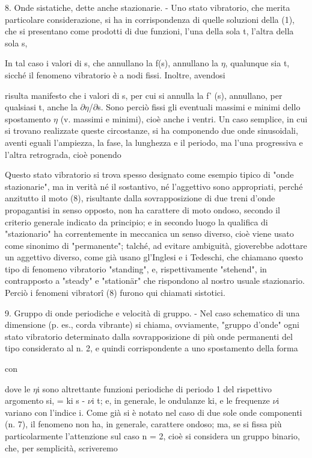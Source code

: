 \documentclass[a4paper]{article}
\begin{document}
8. Onde sistatiche, dette anche stazionarie. - Uno stato vibratorio, che merita particolare considerazione, si ha in corrispondenza di quelle soluzioni della (1), che si presentano come prodotti di due funzioni, l'una della sola t, l'altra della sola s,

In tal caso i valori di s, che annullano la f(s), annullano la $\eta$, qualunque sia t, sicché il fenomeno vibratorio è a nodi fissi. Inoltre, avendosi

risulta manifesto che i valori di s, per cui si annulla la f' (s), annullano, per qualsiasi t, anche la $\partial$$\eta$/$\partial$s. Sono perciò fissi gli eventuali massimi e minimi dello spostamento $\eta$ (v. massimi e minimi), cioè anche i ventri. Un caso semplice, in cui si trovano realizzate queste circostanze, si ha componendo due onde sinusoidali, aventi eguali l'ampiezza, la fase, la lunghezza e il periodo, ma l'una progressiva e l'altra retrograda, cioè ponendo

Questo stato vibratorio si trova spesso designato come esempio tipico di "onde stazionarie", ma in verità né il sostantivo, né l'aggettivo sono appropriati, perché anzitutto il moto (8), risultante dalla sovrapposizione di due treni d'onde propagantisi in senso opposto, non ha carattere di moto ondoso, secondo il criterio generale indicato da principio; e in secondo luogo la qualifica di "stazionario" ha correntemente in meccanica un senso diverso, cioè viene usato come sinonimo di "permanente"; talché, ad evitare ambiguità, gioverebbe adottare un aggettivo diverso, come già usano gl'Inglesi e i Tedeschi, che chiamano questo tipo di fenomeno vibratorio "standing", e, rispettivamente "stehend", in contrapposto a "steady" e "stationär" che rispondono al nostro usuale stazionario. Perciò i fenomeni vibratorî (8) furono qui chiamati sistotici.

9. Gruppo di onde periodiche e velocità di gruppo. - Nel caso schematico di una dimensione (p. es., corda vibrante) si chiama, ovviamente, "gruppo d'onde" ogni stato vibratorio determinato dalla sovrapposizione di più onde permanenti del tipo considerato al n. 2, e quindi corrispondente a uno spostamento della forma

con

dove le $\eta$i sono altrettante funzioni periodiche di periodo 1 del rispettivo argomento si, = ki s - $\nu$i t; e, in generale, le ondulanze ki, e le frequenze $\nu$i variano con l'indice i. Come già si è notato nel caso di due sole onde componenti (n. 7), il fenomeno non ha, in generale, carattere ondoso; ma, se si fissa più particolarmente l'attenzione sul caso n = 2, cioè si considera un gruppo binario, che, per semplicità, scriveremo
\end{document}
